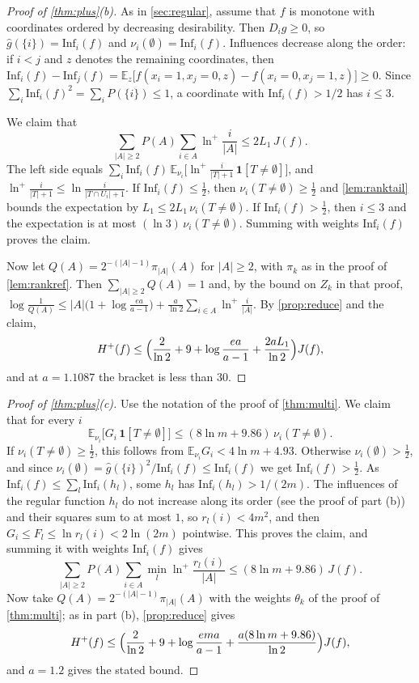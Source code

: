 \documentclass[11pt]{amsart}
\theoremstyle{definition}
\theoremstyle{remark}
\newcommand{\E}{\mathbb{E}}
\newcommand{\Inf}{\mathrm{Inf}}
\newcommand{\hatg}{\widehat{g}}
\begin{document}
\begin{proof}[Proof of \cref{thm:plus}\textup{(b)}]
As in \cref{sec:regular}, assume that $f$ is monotone with coordinates ordered by decreasing desirability. Then
$D_ig\ge0$, so $\hatg(\{i\})=\Inf_i(f)$ and $\nu_i(\emptyset)=\Inf_i(f)$. Influences decrease along the order: if
$i<j$ and $z$ denotes the remaining coordinates, then
$\Inf_i(f)-\Inf_j(f)=\E_z\bigl[f(x_i{=}1,x_j{=}0,z)-f(x_i{=}0,x_j{=}1,z)\bigr]\ge0$. Since
$\sum_i\Inf_i(f)^2=\sum_iP(\{i\})\le1$, a coordinate with $\Inf_i(f)>1/2$ has $i\le3$.

We claim that
\[
\sum_{|A|\ge2}P(A)\sum_{i\in A}\ln^+\frac i{|A|}\le2L_1\,J(f).
\]
The left side equals $\sum_i\Inf_i(f)\,\E_{\nu_i}\bigl[\ln^+\frac i{|T|+1}\,\mathbf 1[T\ne\emptyset]\bigr]$, and
$\ln^+\frac i{|T|+1}\le\ln\frac i{|T\cap U_i|+1}$. If $\Inf_i(f)\le\frac12$, then $\nu_i(T\ne\emptyset)\ge\frac12$
and \cref{lem:ranktail} bounds the expectation by $L_1\le2L_1\,\nu_i(T\ne\emptyset)$. If $\Inf_i(f)>\frac12$, then
$i\le3$ and the expectation is at most $(\ln3)\,\nu_i(T\ne\emptyset)$. Summing with weights $\Inf_i(f)$ proves the
claim.

Now let $Q(A)=2^{-(|A|-1)}\pi_{|A|}(A)$ for $|A|\ge2$, with $\pi_k$ as in the proof of \cref{lem:rankref}. Then
$\sum_{|A|\ge2}Q(A)=1$ and, by the bound on $Z_k$ in that proof,
$\log\frac1{Q(A)}\le|A|\bigl(1+\log\frac{ea}{a-1}\bigr)+\frac a{\ln2}\sum_{i\in A}\ln^+\frac i{|A|}$. By
\cref{prop:reduce} and the claim,
\[
H^+(f)\le\Bigl(\frac2{\ln2}+9+\log\frac{ea}{a-1}+\frac{2aL_1}{\ln2}\Bigr)J(f),
\]
and at $a=1.1087$ the bracket is less than $30$.
\end{proof}

\begin{proof}[Proof of \cref{thm:plus}\textup{(c)}]
Use the notation of the proof of \cref{thm:multi}. We claim that for every $i$
\[
\E_{\nu_i}\bigl[G_i\,\mathbf 1[T\ne\emptyset]\bigr]\le(8\ln m+9.86)\,\nu_i(T\ne\emptyset).
\]
If $\nu_i(T\ne\emptyset)\ge\frac12$, this follows from $\E_{\nu_i}G_i<4\ln m+4.93$. Otherwise
$\nu_i(\emptyset)>\frac12$, and since $\nu_i(\emptyset)=\hatg(\{i\})^2/\Inf_i(f)\le\Inf_i(f)$ we get $\Inf_i(f)>\frac12$.
As $\Inf_i(f)\le\sum_l\Inf_i(h_l)$, some $h_l$ has $\Inf_i(h_l)>1/(2m)$. The influences of the regular function $h_l$
do not increase along its order (see the proof of part (b)) and their squares sum to at most $1$, so
$r_l(i)<4m^2$, and then $G_i\le F_l\le\ln r_l(i)<2\ln(2m)$ pointwise. This proves the claim, and summing it with
weights $\Inf_i(f)$ gives
\[
\sum_{|A|\ge2}P(A)\sum_{i\in A}\min_l\ln^+\frac{r_l(i)}{|A|}\le(8\ln m+9.86)\,J(f).
\]
Now take $Q(A)=2^{-(|A|-1)}\pi_{|A|}(A)$ with the weights $\theta_k$ of the proof of \cref{thm:multi}; as in part (b),
\cref{prop:reduce} gives
\[
H^+(f)\le\Bigl(\frac2{\ln2}+9+\log\frac{ema}{a-1}+\frac{a(8\ln m+9.86)}{\ln2}\Bigr)J(f),
\]
and $a=1.2$ gives the stated bound.
\end{proof}
\end{document}
